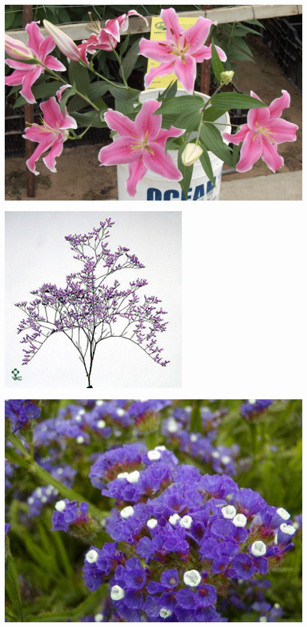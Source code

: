 \documentclass{article}
\begin{document}
\begin{center}
\includegraphics[width=0.9\textheight, angle=90]{../Lily_Oriental.jpg}
\end{center}
\newpage

\begin{center}
\includegraphics[width=0.9\textheight, angle=90]{../Limonium_MistyBlue.jpg}
\end{center}
\newpage

\begin{center}
\includegraphics[width=0.9\textheight, angle=90]{../Limonium_sinuatum.jpg}
\end{center}
\newpage
\end{document}
